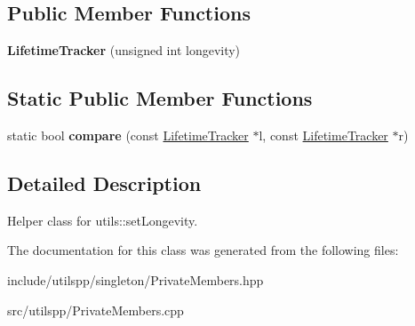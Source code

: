 \subsection*{Public Member Functions}
\begin{DoxyCompactItemize}
\item 
\hypertarget{classutilspp_1_1PrivateMembers_1_1LifetimeTracker_af2a64fb6d37d28fe17d14fdd3234f5e8}{{\bfseries Lifetime\-Tracker} (unsigned int longevity)}\label{classutilspp_1_1PrivateMembers_1_1LifetimeTracker_af2a64fb6d37d28fe17d14fdd3234f5e8}

\end{DoxyCompactItemize}
\subsection*{Static Public Member Functions}
\begin{DoxyCompactItemize}
\item 
\hypertarget{classutilspp_1_1PrivateMembers_1_1LifetimeTracker_a82b8063ee74ef8b9719d207d07355a54}{static bool {\bfseries compare} (const \hyperlink{classutilspp_1_1PrivateMembers_1_1LifetimeTracker}{Lifetime\-Tracker} $\ast$l, const \hyperlink{classutilspp_1_1PrivateMembers_1_1LifetimeTracker}{Lifetime\-Tracker} $\ast$r)}\label{classutilspp_1_1PrivateMembers_1_1LifetimeTracker_a82b8063ee74ef8b9719d207d07355a54}

\end{DoxyCompactItemize}


\subsection{Detailed Description}
Helper class for utils\-::set\-Longevity. 

The documentation for this class was generated from the following files\-:\begin{DoxyCompactItemize}
\item 
include/utilspp/singleton/Private\-Members.\-hpp\item 
src/utilspp/Private\-Members.\-cpp\end{DoxyCompactItemize}
